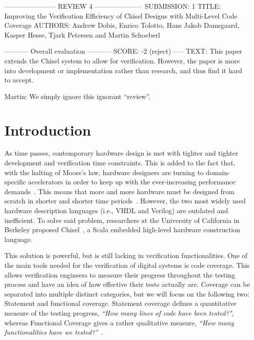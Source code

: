 \documentclass[runningheads]{llncs}
\newcommand{\martin}[1]{{\color{blue} Martin: #1}}
\begin{document}
----------------------- REVIEW 4 ---------------------
SUBMISSION: 1
TITLE: Improving the Verification Efficiency of Chisel Designs with Multi-Level Code Coverage
AUTHORS: Andrew Dobis, Enrico Tolotto, Hans Jakob Damsgaard, Kasper Hesse, Tjark Petersen and Martin Schoeberl

----------- Overall evaluation -----------
SCORE: -2 (reject)
----- TEXT:
This paper extends the Chisel system to allow for verification. However, the paper is more into development or implementation rather than research, and thus find it hard to accept.

\martin{We simply ignore this ignorant ``review''.}

\section{Introduction}
\label{sec:objectives}
As time passes, contemporary hardware design is met with tighter and tighter development and verification time constraints. This is added to the fact that, with the halting of Moore's law, hardware designers are turning to domain-specific accelerators in order to keep up with the ever-increasing performance demands~\cite{henn-patt:turing:2019}. This means that more and more hardware must be designed from scratch in shorter and shorter time periods~\cite{domain-hw-acc:2020}. However, the two most widely used hardware description languages (i.e., VHDL and Verilog) are outdated and inefficient. To solve said problem, researchers at the University of California in Berkeley proposed Chisel~\cite{chisel:dac2012}, a Scala embedded high-level hardware construction language.

This solution is powerful, but is still lacking in verification functionalities. One of the main tools needed for the verification of digital systems is code coverage. This allows verification engineers to measure their progress throughout the testing process and have an idea of how effective their tests actually are. Coverage can be separated into multiple distinct categories, but we will focus on the following two: Statement and functional coverage. Statement coverage defines a quantitative measure of the testing progress, \textit{``How many lines of code have been tested?"}, whereas Functional Coverage gives a rather qualitative measure, \textit{``How many functionalities have we tested?"}~\cite{spear2008systemverilog}.

\end{document}
